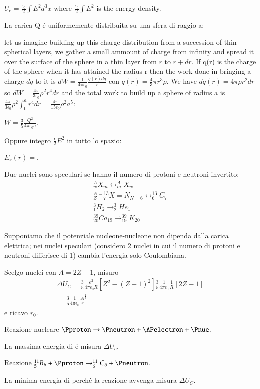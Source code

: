 \documentclass[main.tex]{subfiles}
\begin{document}
$U_e=\frac{\epsilon_0}{2}\int E^2d^3x$ where $\frac{\epsilon_0}{2}\int E^2$  is the energy density.

La carica Q \'e uniformemente distribuita su una sfera di raggio a:

let us imagine building up this charge distribution from a succession of thin spherical layers, we gather a small ammount of charge from infinity and spread it over the surface of the sphere in a thin layer from $r$ to $r+dr$. If q(r) is the charge of the sphere when it has attained the radius r then the work done in bringing a charge $dq$ to it is $dW=\frac{1}{4\pi\epsilon_0}\frac{q(r)dq}{r}$ con $q(r)=\frac{4}{3}\pi r^3\rho$.
We have $dq(r)=4\pi \rho r^2dr$ so $dW=\frac{4\pi}{3\epsilon_0}\rho^2r^4dr$ and the total work to build up a sphere of radius a is $\frac{4\pi}{3\epsilon_0}\rho^2\int_0^ar^4dr=\frac{4\pi}{15\epsilon_0}\rho^2a^5$: 

$W=\frac{3}{5}\frac{Q^2}{4\pi\epsilon_0a}$.

Oppure integro $\frac{\epsilon}{2}E^2$ in tutto lo spazio:

$E_r(r)=$.

Due nuclei sono speculari se  hanno il numero di protoni e neutroni invertito: 
\begin{align*}
^A_wX_m \leftrightarrow ^A_mX_w\\
^{A=13}_{Z=7}{X=N}_{N=6} \leftrightarrow ^{13}_6C_7\\
^3_1H_2 \rightarrow ^3_2He_1\\
^{39}_{20}Ca_{19}\rightarrow ^{39}_{19}K_{20}
\end{align*}

Supponiamo che il potenziale nucleone-nucleone non dipenda dalla carica elettrica; nei nuclei speculari (considero 2 nuclei in cui il numero di protoni e neutroni differisce di 1) cambia l'energia solo  Coulombiana. 

Scelgo nuclei con $A=2Z-1$, misuro 
\begin{align*}
\Delta U_C=\frac{3}{5}\frac{e^2}{4\pi\epsilon_0R}[Z^2-(Z-1)^2]\frac{3}{5}\frac{1}{4\pi\epsilon_0}\frac{1}{R}[2Z-1]\\
=\frac{3}{5}\frac{1}{4\pi\epsilon_0}\frac{A^{\frac{2}{3}}}{r_0}
\end{align*}
e ricavo $r_0$.
\begin{enumerate*}
\item Reazione nucleare $\Pproton\rightarrow \Pneutron +\APelectron +\Pnue$.

La massima energia di \APelectron \'e misura $\Delta U_c$.

\item Reazione $^{11}_5B_6+\Pproton\rightarrow^{11}_6C_5+\Pneutron$.

La minima energia di \Pproton perch\'e la reazione avvenga misura $\Delta U_C$.
\end{enumerate*}
 
\end{document}
